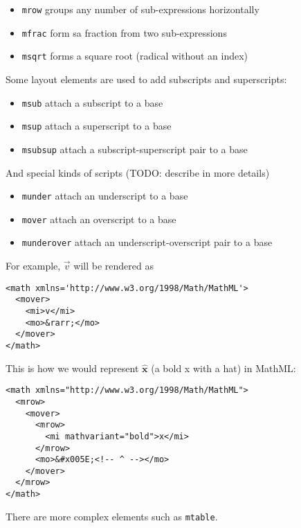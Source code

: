 \begin{itemize}
\itemsep1pt\parskip0pt
\item
  \texttt{mrow} groups any number of sub-expressions horizontally
\item
  \texttt{mfrac} form sa fraction from two sub-expressions
\item
  \texttt{msqrt} forms a square root (radical without an index)
\end{itemize}

Some layout elements are used to add subscripts and superscripts:

\begin{itemize}
\itemsep1pt\parskip0pt
\item
  \texttt{msub} attach a subscript to a base
\item
  \texttt{msup} attach a superscript to a base
\item
  \texttt{msubsup} attach a subscript-superscript pair to a base
\end{itemize}

And special kinds of scripts (TODO: describe in more details)

\begin{itemize}
\itemsep1pt\parskip0pt
\item
  \texttt{munder} attach an underscript to a base
\item
  \texttt{mover} attach an overscript to a base
\item
  \texttt{munderover} attach an underscript-overscript pair to a base
\end{itemize}

For example, $\vec v$ will be rendered as

\begin{verbatim}
<math xmlns='http://www.w3.org/1998/Math/MathML'>
  <mover>
    <mi>v</mi>
    <mo>&rarr;</mo>
  </mover>
</math>
\end{verbatim}


This is how we would represent $\hat{ \mathbf x}$ (a bold x with a hat) in MathML:

\begin{verbatim}
<math xmlns="http://www.w3.org/1998/Math/MathML">
  <mrow>
    <mover>
      <mrow>
        <mi mathvariant="bold">x</mi>
      </mrow>
      <mo>&#x005E;<!-- ^ --></mo>
    </mover>
  </mrow>
</math>
\end{verbatim}

There are more complex elements such as \texttt{mtable}.

